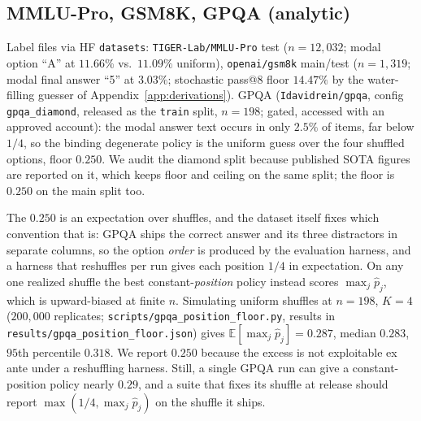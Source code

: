 \documentclass{article}
\theoremstyle{plain}
\theoremstyle{definition}
\begin{document}
\subsection{MMLU-Pro, GSM8K, GPQA (analytic)}
Label files via HF \texttt{datasets}: \texttt{TIGER-Lab/MMLU-Pro} test ($n{=}12{,}032$; modal option ``A'' at $11.66\%$ vs.\ $11.09\%$ uniform), \texttt{openai/gsm8k} main/test ($n{=}1{,}319$; modal final answer ``5'' at $3.03\%$; stochastic pass@8 floor $14.47\%$ by the water-filling guesser of Appendix~\ref{app:derivations}). GPQA (\texttt{Idavidrein/gpqa}, config \texttt{gpqa\_diamond}, released as the \texttt{train} split, $n{=}198$; gated, accessed with an approved account): the modal answer text occurs in only $2.5\%$ of items, far below $1/4$, so the binding degenerate policy is the uniform guess over the four shuffled options, floor $0.250$. We audit the diamond split because published SOTA figures are reported on it, which keeps floor and ceiling on the same split; the floor is $0.250$ on the main split too.

The $0.250$ is an expectation over shuffles, and the dataset itself fixes which convention that is: GPQA ships the correct answer and its three distractors in separate columns, so the option \emph{order} is produced by the evaluation harness, and a harness that reshuffles per run gives each position $1/4$ in expectation. On any one realized shuffle the best constant-\emph{position} policy instead scores $\max_j \hat{p}_j$, which is upward-biased at finite $n$. Simulating uniform shuffles at $n = 198$, $K = 4$ ($200{,}000$ replicates; \texttt{scripts/gpqa\_position\_floor.py}, results in \texttt{results/gpqa\_position\_floor.json}) gives $\mathbb{E}[\max_j \hat{p}_j] = 0.287$, median $0.283$, $95$th percentile $0.318$. We report $0.250$ because the excess is not exploitable ex ante under a reshuffling harness. Still, a single GPQA run can give a constant-position policy nearly $0.29$, and a suite that fixes its shuffle at release should report $\max(1/4, \max_j \hat{p}_j)$ on the shuffle it ships.
\end{document}
